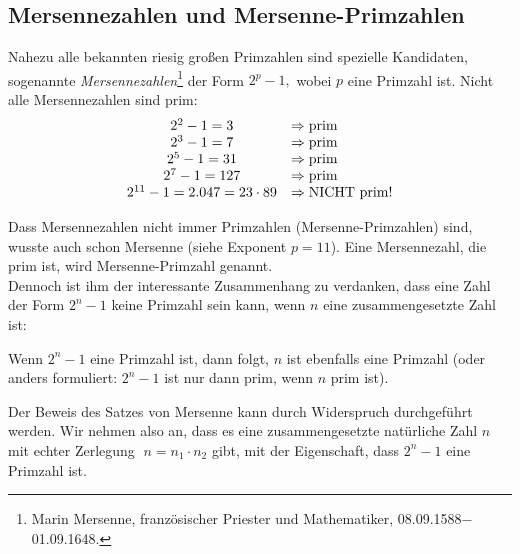 \begin{refsegment}
\clearpage


\hypertarget{MersenneNumbers01}{}
\subsection{Mersennezahlen und Mersenne-Primzahlen}
\label{zahlentyp_mersenne}

Nahezu alle bekannten riesig großen Primzahlen sind spezielle
Kandidaten, sogenannte {\em Mersennezahlen}\footnote{%
Marin Mersenne, französischer Priester und Mathematiker,
08.09.1588$-$01.09.1648.
}
der Form $2^p -1,$ wobei $p$ eine Primzahl ist.
Nicht alle Mersennezahlen sind prim:
$$
\begin{array}{cl}
2^2 - 1 = 3 & \Rightarrow {\rm prim} \\
2^3 - 1 = 7 & \Rightarrow {\rm prim} \\
2^5 - 1 = 31    & \Rightarrow {\rm prim} \\
2^7 - 1 = 127    & \Rightarrow {\rm prim} \\
2^{11} - 1 = 2.047 = 23 \cdot 89    & \Rightarrow  {\rm NICHT~prim} !
\end{array}
$$


Dass Mersennezahlen nicht immer Primzahlen (Mersenne-Primzahlen) sind,
wusste auch schon Mersenne (siehe Exponent $p = 11$).
Eine Mersennezahl, die prim ist, wird Mersenne-Primzahl
 genannt.  \\

Dennoch ist ihm der interessante Zusammenhang zu verdanken, dass eine
Zahl der Form $2^n-1$ keine Primzahl sein kann, wenn $n$ eine
zusammengesetzte Zahl ist:

\begin{satz}[Mersenne]\label{thm-pz-mersenne}
  Wenn $2^n - 1$ eine Primzahl ist, dann folgt, $n$ ist ebenfalls eine
  Primzahl (oder anders formuliert: $2^n - 1$ ist nur dann prim,
  wenn $n$ prim ist).
\end{satz}

\begin{Beweis}{}
Der Beweis des Satzes von Mersenne kann durch Widerspruch
durchgeführt werden. Wir nehmen also an, dass es eine
zusammengesetzte natürliche Zahl $ n $ mit echter Zerlegung
$\; n=n_1 \cdot n_2 $
gibt, mit der Eigenschaft, dass $ 2^n -1 $ eine
Primzahl ist.


\end{Beweis}
\end{refsegment}
